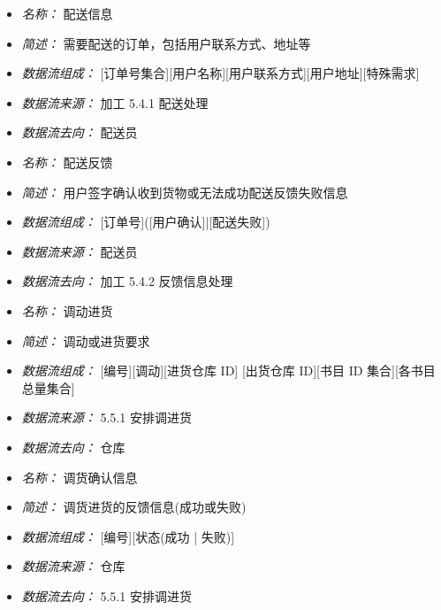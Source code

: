 \vspace{-1mm}


\begin{itemize}
\item \textit{名称： }配送信息
\item \textit{简述： }需要配送的订单，包括用户联系方式、地址等 
\item \textit{数据流组成： }[订单号集合][用户名称][用户联系方式][用户地址][特殊需求] 
\item \textit{数据流来源： }加工 5.4.1 配送处理
\item \textit{数据流去向： }配送员

\end{itemize}


\vspace{-1mm}


\begin{itemize}
\item \textit{名称： }配送反馈 
\item \textit{简述： }用户签字确认收到货物或无法成功配送反馈失败信息 
\item \textit{数据流组成： }[订单号]([用户确认]|[配送失败]) 
\item \textit{数据流来源： }配送员
\item \textit{数据流去向： }加工 5.4.2 反馈信息处理

\end{itemize}


\vspace{-1mm}


\begin{itemize}
\item \textit{名称： }调动进货
\item \textit{简述： }调动或进货要求
\item \textit{数据流组成： }[编号][调动][进货仓库 ID] [出货仓库 ID][书目 ID 集合][各书目总量集合] 
\item \textit{数据流来源： }5.5.1 安排调进货
\item \textit{数据流去向： }仓库

\end{itemize}


\vspace{-1mm}


\begin{itemize}
\item \textit{名称： }调货确认信息
\item \textit{简述： } 调货进货的反馈信息(成功或失败) 
\item \textit{数据流组成： }[编号][状态(成功 | 失败)] 
\item \textit{数据流来源： }仓库
\item \textit{数据流去向： }5.5.1 安排调进货

\end{itemize}


